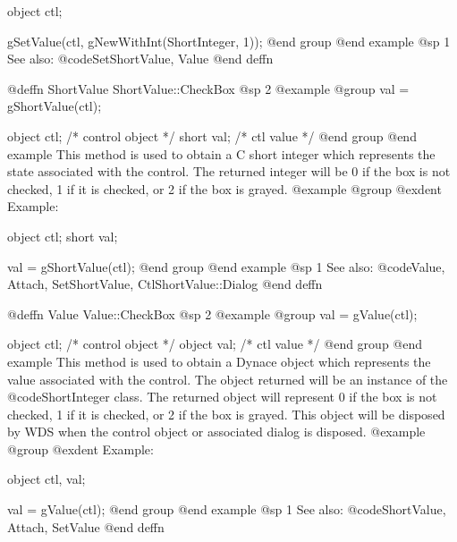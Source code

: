 object  ctl;

gSetValue(ctl, gNewWithInt(ShortInteger, 1));
@end group
@end example
@sp 1
See also:  @code{SetShortValue, Value}
@end deffn













@deffn {ShortValue} ShortValue::CheckBox
@sp 2
@example
@group
val = gShortValue(ctl);

object  ctl;   /*  control object  */
short   val;   /*  ctl value       */
@end group
@end example
This method is used to obtain a C short integer which represents the
state associated with the control.  The returned integer will be 0 if
the box is not checked, 1 if it is checked, or 2 if the box is grayed.
@example
@group
@exdent Example:

object  ctl;
short   val;

val = gShortValue(ctl);
@end group
@end example
@sp 1
See also:  @code{Value, Attach, SetShortValue, CtlShortValue::Dialog}
@end deffn













@deffn {Value} Value::CheckBox
@sp 2
@example
@group
val = gValue(ctl);

object  ctl;   /*  control object  */
object  val;   /*  ctl value       */
@end group
@end example
This method is used to obtain a Dynace object which represents the value
associated with the control.  The object returned will be an instance of
the @code{ShortInteger} class.  The returned object will represent 0 if
the box is not checked, 1 if it is checked, or 2 if the box is grayed.
This object will be disposed by WDS when the control object or
associated dialog is disposed.
@example
@group
@exdent Example:

object  ctl, val;

val = gValue(ctl);
@end group
@end example
@sp 1
See also:  @code{ShortValue, Attach, SetValue}
@end deffn















